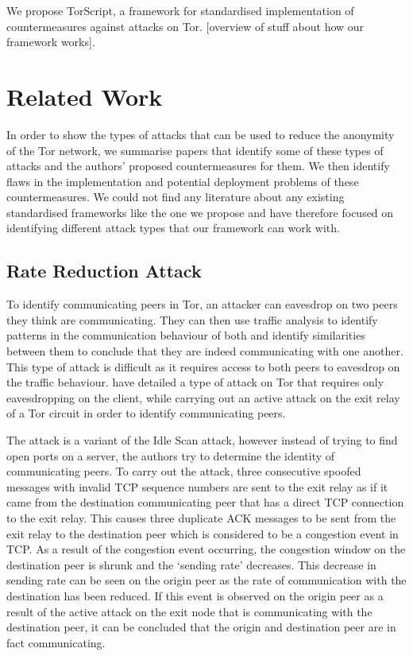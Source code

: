 \documentclass[9pt,technote]{IEEEtran}
\begin{document}
We propose TorScript, a framework for standardised implementation of countermeasures against attacks on Tor. [overview of stuff about how our framework works].

\cite{hayesguard}\cite{gilad2012spying}\cite{sun2015raptor}\cite{biryukov2012torscan}\cite{jansen2014sniper}\cite{tor}

\section{Related Work} In order to show the types of attacks that can be used to reduce the anonymity of the Tor network, we summarise papers that identify some of these types of attacks and the authors' proposed countermeasures for them. We then identify flaws in the implementation and potential deployment problems of these countermeasures. We could not find any literature about any existing standardised frameworks like the one we propose and have therefore focused on identifying different attack types that our framework can work with.\\

\subsection{Rate Reduction Attack}
To identify communicating peers in Tor, an attacker can eavesdrop on two peers they think are communicating. They can then use traffic analysis to identify patterns in the communication behaviour of both and identify similarities between them to conclude that they are indeed communicating with one another. This type of attack is difficult as it requires access to both peers to eavesdrop on the traffic behaviour. \citeauthor{gilad2012spying} have detailed a type of attack on Tor that requires only eavesdropping on the client, while carrying out an active attack on the exit relay of a Tor circuit in order to identify communicating peers.

The attack is a variant of the Idle Scan attack, however instead of trying to find open ports on a server, the authors try to determine the identity of communicating peers. To carry out the attack, three consecutive spoofed messages with invalid TCP sequence numbers are sent to the exit relay as if it came from the destination communicating peer that has a direct TCP connection to the exit relay. This causes three duplicate ACK messages to be sent from the exit relay to the destination peer which is considered to be a congestion event in TCP. As a result of the congestion event occurring, the congestion window on the destination peer is shrunk and the `sending rate' decreases. This decrease in sending rate can be seen on the origin peer as the rate of communication with the destination has been reduced. If this event is observed on the origin peer as a result of the active attack on the exit node that is communicating with the destination peer, it can be concluded that the origin and destination peer are in fact communicating.
\end{document}
